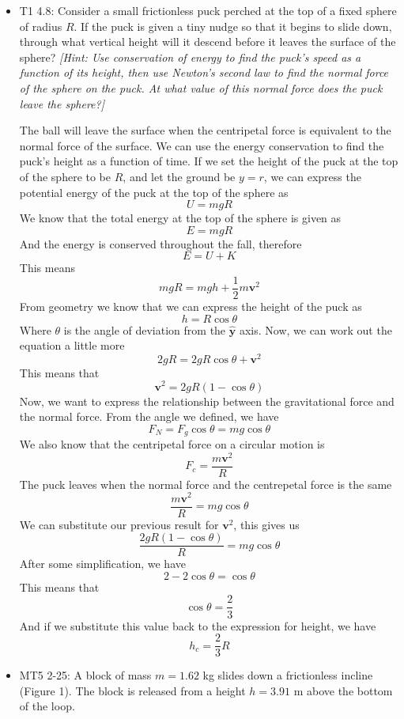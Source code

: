 \documentclass[12pt]{article}
\newcommand{\paren}[1]{\left( #1 \right)}
\newcommand{\uny}{\hat{\mathbf{y}}}
\begin{document}
\begin{itemize}
    \item T1 4.8: Consider a small frictionless puck perched at the top of a fixed sphere of radius $R$. If the puck is given a tiny nudge so that it begins to slide down, through what vertical height will it descend before it leaves the surface of the sphere? \textit{[Hint: Use conservation of energy to find the puck's speed as a function of its height, then use Newton's second law to find the normal force of the sphere on the puck. At what value of this normal force does the puck leave the sphere?]}

    The ball will leave the surface when the centripetal force is equivalent to the normal force of the surface. We can use the energy conservation to find the puck's height as a function of time. If we set the height of the puck at the top of the sphere to be $R$, and let the ground be $y=r$, we can express the potential energy of the puck at the top of the sphere as
    \[
    U = mgR
    \]
    We know that the total energy at the top of the sphere is given as
    \[
    E = mgR
    \]
    And the energy is conserved throughout the fall, therefore
    \[
    E = U+K
    \]
    This means
    \[
    mgR = mgh + \frac{1}{2}m\mathbf{v}^2
    \]
    From geometry we know that we can express the height of the puck as
    \[
    h = R\cos\theta
    \]
    Where $\theta$ is the angle of deviation from the $\uny$ axis. Now, we can work out the equation a little more
    \[
    2gR = 2gR\cos\theta + \mathbf{v}^2
    \]
    This means that
    \[
    \mathbf{v}^2 = 2gR\paren{1-\cos\theta}
    \]
    Now, we want to express the relationship between the gravitational force and the normal force. From the angle we defined, we have
    \[
    F_N = F_g\cos\theta = mg\cos\theta
    \]
    We also know that the centripetal force on a circular motion is
    \[
    F_c = \frac{m\mathbf{v}^2}{R}
    \]
    The puck leaves when the normal force and the centrepetal force is the same
    \[
    \frac{m\mathbf{v}^2}{R} = mg\cos\theta
    \]
    We can substitute our previous result for $\mathbf{v}^2$, this gives us
    \[
    \frac{2gR\paren{1-\cos\theta}}{R} = mg\cos\theta
    \]
    After some simplification, we have
    \[
    2-2\cos\theta = \cos\theta
    \]
    This means that
    \[
    \cos\theta = \frac{2}{3}
    \]
    And if we substitute this value back to the expression for height, we have
    \[
    h_{c} = \frac{2}{3}R
    \]
    \newpage
    \item MT5 2-25: 
A block of mass $m = 1.62$ kg slides down a frictionless incline (Figure 1). The block is released from a height $h = 3.91$ m above the bottom of the loop.


\end{itemize}
\end{document}
